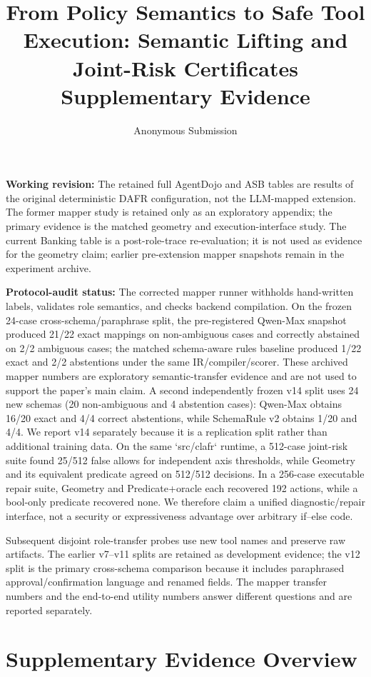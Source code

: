 \documentclass[letterpaper]{article}
\title{From Policy Semantics to Safe Tool Execution: Semantic Lifting and Joint-Risk Certificates\\Supplementary Evidence}
\author{Anonymous Submission}
\begin{document}
\maketitle
\noindent\textbf{Working revision:} The retained full AgentDojo and ASB tables are results of the original deterministic DAFR configuration, not the LLM-mapped extension. The former mapper study is retained only as an exploratory appendix; the primary evidence is the matched geometry and execution-interface study. The current Banking table is a post-role-trace re-evaluation; it is not used as evidence for the geometry claim; earlier pre-extension mapper snapshots remain in the experiment archive.

\noindent\textbf{Protocol-audit status:} The corrected mapper runner withholds hand-written labels, validates role semantics, and checks backend compilation. On the frozen 24-case cross-schema/paraphrase split, the pre-registered Qwen-Max snapshot produced 21/22 exact mappings on non-ambiguous cases and correctly abstained on 2/2 ambiguous cases; the matched schema-aware rules baseline produced 1/22 exact and 2/2 abstentions under the same IR/compiler/scorer. These archived mapper numbers are exploratory semantic-transfer evidence and are not used to support the paper's main claim. A second independently frozen v14 split uses 24 new schemas (20 non-ambiguous and 4 abstention cases): Qwen-Max obtains 16/20 exact and 4/4 correct abstentions, while SchemaRule v2 obtains 1/20 and 4/4. We report v14 separately because it is a replication split rather than additional training data. On the same `src/clafr` runtime, a 512-case joint-risk suite found 25/512 false allows for independent axis thresholds, while Geometry and its equivalent predicate agreed on 512/512 decisions. In a 256-case executable repair suite, Geometry and Predicate+oracle each recovered 192 actions, while a bool-only predicate recovered none. We therefore claim a unified diagnostic/repair interface, not a security or expressiveness advantage over arbitrary if--else code.

\noindent Subsequent disjoint role-transfer probes use new tool names and preserve raw artifacts. The earlier v7--v11 splits are retained as development evidence; the v12 split is the primary cross-schema comparison because it includes paraphrased approval/confirmation language and renamed fields. The mapper transfer numbers and the end-to-end utility numbers answer different questions and are reported separately.


\section{Supplementary Evidence Overview}
\end{document}
